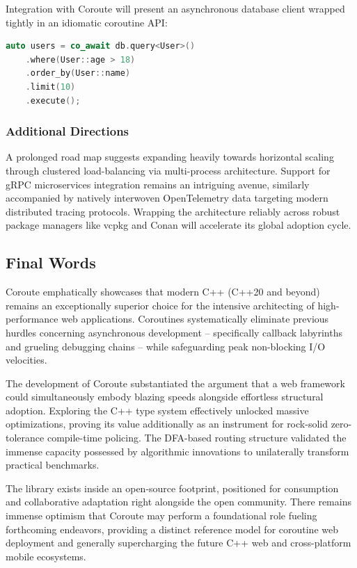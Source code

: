 Integration with Coroute will present an asynchronous database client wrapped tightly in an idiomatic coroutine API:
\begin{lstlisting}[language=C++, basicstyle=\small\ttfamily]
auto users = co_await db.query<User>()
    .where(User::age > 18)
    .order_by(User::name)
    .limit(10)
    .execute();
\end{lstlisting}

\subsubsection{Additional Directions}

A prolonged road map suggests expanding heavily towards horizontal scaling through clustered load-balancing via multi-process architecture. Support for gRPC microservices integration remains an intriguing avenue, similarly accompanied by natively interwoven OpenTelemetry data targeting modern distributed tracing protocols. Wrapping the architecture reliably across robust package managers like vcpkg and Conan will accelerate its global adoption cycle.

\subsection{Final Words}

Coroute emphatically showcases that modern C++ (C++20 and beyond) remains an exceptionally superior choice for the intensive architecting of high-performance web applications. Coroutines systematically eliminate previous hurdles concerning asynchronous development -- specifically callback labyrinths and grueling debugging chains -- while safeguarding peak non-blocking I/O velocities.

The development of Coroute substantiated the argument that a web framework could simultaneously embody blazing speeds alongside effortless structural adoption. Exploring the C++ type system effectively unlocked massive optimizations, proving its value additionally as an instrument for rock-solid zero-tolerance compile-time policing. The DFA-based routing structure validated the immense capacity possessed by algorithmic innovations to unilaterally transform practical benchmarks.

The library exists inside an open-source footprint, positioned for consumption and collaborative adaptation right alongside the open community. There remains immense optimism that Coroute may perform a foundational role fueling forthcoming endeavors, providing a distinct reference model for coroutine web deployment and generally supercharging the future C++ web and cross-platform mobile ecosystems.

